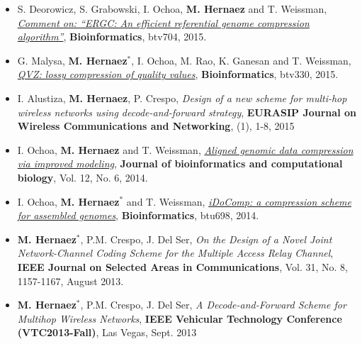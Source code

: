 \documentclass[11pt,a4paper,sans]{moderncv}        %
\begin{document}
\begin{itemize}
\item S. Deorowicz, S. Grabowski, I. Ochoa, \textbf{M. Hernaez} and T. Weissman, \href{http://web.stanford.edu/~iochoa/publishedPublications/2015_ergc-comment.pdf}{\emph{ Comment on: ``ERGC: An efficient referential genome compression algorithm''}}, \textbf{Bioinformatics}, btv704, 2015.\\

\item G. Malysa, \textbf{M. Hernaez}$^\ast$, I. Ochoa, M. Rao, K. Ganesan and T. Weissman, \href{http://web.stanford.edu/~iochoa/publishedPublications/2015_qvz_paper.pdf}{\emph{ QVZ: lossy compression of quality values}}, \textbf{Bioinformatics}, btv330, 2015.\\

\item I. Alustiza, \textbf{M. Hernaez}, P. Crespo, {\emph{Design of a new scheme for multi-hop wireless networks using decode-and-forward strategy}}, \textbf{EURASIP Journal on Wireless Communications and Networking}, (1), 1-8, 2015\\

\item I. Ochoa, \textbf{M. Hernaez} and T. Weissman, \href{http://web.stanford.edu/~iochoa/publishedPublications/2014_cbc.pdf}{\emph{ Aligned genomic data compression via improved modeling}}, \textbf{Journal of bioinformatics and computational biology}, Vol. 12, No. 6, 2014.\\

\item I. Ochoa, \textbf{M. Hernaez}$^\ast$ and T. Weissman, \href{http://web.stanford.edu/~iochoa/publishedPublications/2014_idocomp_paper.pdf}{\emph{ iDoComp: a compression scheme for assembled genomes}}, \textbf{Bioinformatics}, btu698, 2014.\\

\item \textbf{M. Hernaez}$^\ast$, P.M. Crespo, J. {Del Ser}, {\emph{ On the Design of a Novel Joint Network-Channel Coding Scheme for the Multiple Access Relay Channel}}, \textbf{IEEE Journal on Selected Areas in Communications}, Vol. 31, No. 8, 1157-1167, August 2013.\\

\item \textbf{M. Hernaez}$^\ast$, P.M. Crespo, J. {Del Ser}, {\emph{A Decode-and-Forward Scheme for Multihop Wireless Networks}, \textbf{IEEE Vehicular Technology Conference (VTC2013-Fall)}}, Las Vegas, Sept. 2013\\


\end{itemize}
\end{document}
